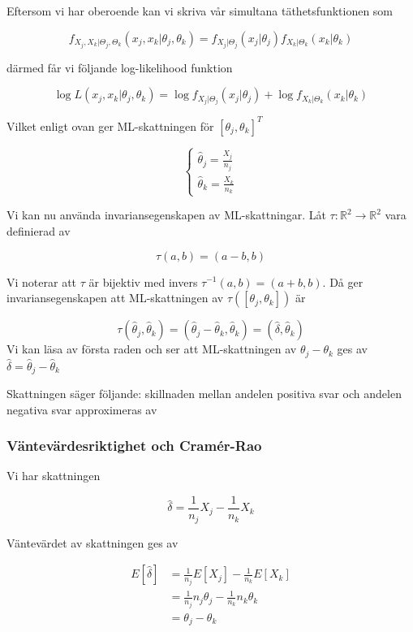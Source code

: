 \documentclass{article}
\begin{document}
Eftersom vi har oberoende kan vi skriva vår simultana  täthetsfunktionen som

\[
f_{X_j,X_k|\Theta_j,\Theta_k}(x_j,x_k|\theta_j,\theta_k)=f_{X_j|\Theta_j}(x_j|\theta_j)f_{X_k|\Theta_k}(x_k|\theta_k)
\]

därmed får vi följande log-likelihood funktion

\[
\log L(x_j,x_k|\theta_j,\theta_k)=\log f_{X_j|\Theta_j}(x_j|\theta_j)+\log f_{X_k|\Theta_k}(x_k|\theta_k)
\]

Vilket enligt ovan ger ML-skattningen för $[\theta_j,\theta_k]^T$

\[
\begin{cases}
    \hat \theta_{j}=\frac{X_j}{n_j}\\
    \hat \theta_{k}=\frac{X_k}{n_k}
\end{cases}
\]

Vi kan nu använda invariansegenskapen av ML-skattningar. Låt $\tau: \mathbb{R}^2\rightarrow \mathbb{R}^2$ vara definierad av

\[
\tau(a,b)=(a-b,b)
\]

Vi noterar att $\tau $ är bijektiv med invers $\tau^{-1}(a,b)=(a+b,b)$. Då ger invariansegenskapen att ML-skattningen av $\tau([\theta_j,\theta_k])$ är 

\[
\tau(\hat \theta_{j},\hat \theta_k)=(\hat \theta_j-\hat \theta_k,\hat \theta_k)=(\hat \delta,\hat \theta_k)
\]
Vi kan läsa av första raden och ser att ML-skattningen av $\theta_j-\theta_k$ ges av $\hat \delta =\hat \theta_j-\hat \theta_k$

Skattningen säger följande: skillnaden mellan andelen positiva svar och andelen negativa svar approximeras av 

\subsubsection{Väntevärdesriktighet och Cramér-Rao}

Vi har skattningen

\[
\hat \delta =\frac{1}{n_j}X_j-\frac{1}{n_k}X_k
\]

Väntevärdet av skattningen ges av

\[
\begin{aligned}
    E[\hat \delta]&=\frac{1}{n_j}E[X_j  ]-\frac{1}{n_k}E[X_k]\\
    &=\frac{1}{n_j}n_j\theta_j-\frac{1}{n_k}n_k\theta_k\\
    &=\theta_j-\theta_k
\end{aligned}
\]
\end{document}

